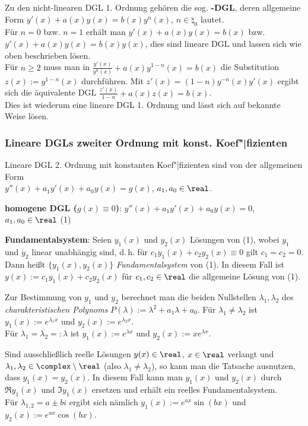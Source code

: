 Zu den nicht-linearen DGL 1. Ordnung
gehören die sog. \textbf{-DGL}, deren
allgemeine Form
$y'(x) + a(x) y(x) = b(x) y^n(x)$, $n \in \natural_0$ lautet. \\
Für $n = 0$ bzw. $n = 1$ erhält man
$y'(x) + a(x) y(x) = b(x)$ bzw.
$y'(x) + a(x) y(x) = b(x) y(x)$,
dies sind lineare DGL und lassen sich wie oben beschrieben lösen. \\
Für $n \ge 2$ muss man in
$\frac{y'(x)}{y^n(x)} + a(x) y^{1-n}(x) = b(x)$ die Substitution
$z(x) := y^{1-n}(x)$ durchführen.
Mit $z'(x) = (1 - n) y^{-n}(x) y'(x)$ ergibt sich
die äquivalente DGL $\frac{z'(x)}{1 - n} + a(x) z(x) = b(x)$. \\
Dies ist wiederum eine lineare DGL 1. Ordnung
und lässt sich auf bekannte Weise lösen.

\pagebreak

\subsubsection{%
    Lineare DGLs zweiter Ordnung mit konst. Koef"|fizienten%
}

Lineare DGL 2. Ordnung mit konstanten Koef"|fizienten sind von der
allgemeinen Form \\
$y''(x) + a_1 y'(x) + a_0 y(x) = g(x)$, $a_1, a_0 \in \real$.

\linie

\textbf{homogene DGL ($g(x) \equiv 0$)}:
$y''(x) + a_1 y'(x) + a_0 y(x) = 0$, $a_1, a_0 \in \real$ \qquad (1)

\textbf{Fundamentalsystem}:
Seien $y_1(x)$ und $y_2(x)$ Lösungen von (1), wobei $y_1$ und $y_2$ linear
unabhängig sind, d.\,h. für $c_1 y_1(x) + c_2 y_2(x) \equiv 0$ gilt
$c_1 = c_2 = 0$. \\
Dann heißt $\{y_1(x), y_2(x)\}$ \emph{Fundamentalsystem} von (1).
In diesem Fall ist \\
$y(x) := c_1 y_1(x) + c_2 y_2(x)$ für $c_1, c_2 \in \real$
die allgemeine Lösung von (1).

Zur Bestimmung von $y_1$ und $y_2$ berechnet man die beiden Nullstellen
$\lambda_1, \lambda_2$ des \emph{charakteristischen Polynoms}
$P(\lambda) := \lambda^2 + a_1 \lambda + a_0$.
Für $\lambda_1 \not= \lambda_2$ ist $y_1(x) := e^{\lambda_1 x}$
und $y_2(x) := e^{\lambda_2 x}$. \\
Für $\lambda_1 = \lambda_2 =: \lambda$ ist
$y_1(x) := e^{\lambda x}$ und $y_2(x) := x e^{\lambda x}$.

Sind ausschließlich reelle Lösungen $y(x) \in \real$, $x \in \real$ verlangt
und $\lambda_1, \lambda_2 \in \complex \setminus \real$
(also $\lambda_1 \not= \lambda_2$), so kann man die Tatsache
ausnutzen, dass $y_1(x) = \overline{y_2(x)}$.
In diesem Fall kann man $y_1(x)$ und $y_2(x)$ durch
$\Re y_1(x)$ und $\Im y_1(x)$ ersetzen und erhält ein reelles
Fundamentalsystem. \\
Für $\lambda_{1,2} = a \pm bi$ ergibt sich nämlich
$y_1(x) := e^{ax} \sin(bx)$ und $y_2(x) := e^{ax} \cos(bx)$.

